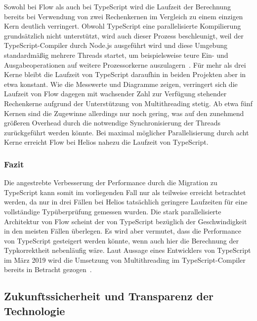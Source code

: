 Sowohl bei Flow als auch bei TypeScript wird die Laufzeit der Berechnung bereits bei Verwendung von zwei Rechenkernen im Vergleich zu einem einzigen Kern deutlich verringert. Obwohl TypeScript eine parallelisierte Kompilierung grundsätzlich nicht unterstützt, wird auch dieser Prozess beschleunigt, weil der TypeScript-Compiler durch Node.js ausgeführt wird und diese Umgebung standardmäßig mehrere Threads startet, um beispielsweise teure Ein- und Ausgabeoperationen auf weitere Prozessorkerne auszulagern~\autocite{NODE:THREADS}. Für mehr als drei Kerne bleibt die Laufzeit von TypeScript daraufhin in beiden Projekten aber in etwa konstant. Wie die Messwerte und Diagramme zeigen, verringert sich die Laufzeit von Flow dagegen mit wachsender Zahl zur Verfügung stehender Rechenkerne aufgrund der Unterstützung von Multithreading stetig. Ab etwa fünf Kernen sind die Zugewinne allerdings nur noch gering, was auf den zunehmend größeren Overhead durch die notwendige Synchronisierung der Threads zurückgeführt werden könnte. Bei maximal möglicher Parallelisierung durch acht Kerne erreicht Flow bei Helios nahezu die Laufzeit von TypeScript.

\subsubsection{Fazit}

Die angestrebte Verbesserung der Performance durch die Migration zu TypeScript kann somit im vorliegenden Fall nur als teilweise erreicht betrachtet werden, da nur in drei Fällen bei Helios tatsächlich geringere Laufzeiten für eine vollständige Typüberprüfung gemessen wurden. Die stark parallelisierte Architektur von Flow scheint der von TypeScript bezüglich der Geschwindigkeit in den meisten Fällen überlegen. Es wird aber vermutet, dass die Performance von TypeScript gesteigert werden könnte, wenn auch hier die Berechnung der Typkorrektheit nebenläufig wäre. Laut Aussage eines Entwicklers von TypeScript im März 2019 wird die Umsetzung von Multithreading im TypeScript-Compiler bereits in Betracht gezogen~\autocite{TS:MULTICORE}.

\subsection{Zukunftssicherheit und Transparenz der Technologie}

